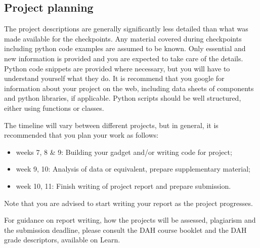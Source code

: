 \subsection{Project planning}

The project descriptions are generally significantly less detailed than what was made available for the checkpoints. Any material covered during checkpoints including python code examples are assumed to be known.  Only essential and new information is provided and you are expected to take care of the details. Python code snippets are provided where necessary, but you will have to understand yourself what they do. It is recommend that you google for information about your project on the web, including data sheets of components and python libraries, if applicable. Python scripts should be well structured, either using functions or classes.

The timeline will vary between different projects, but in general, it is recommended that you plan your work as follows:
\begin{itemize}
\item	weeks 7, 8 \& 9: 	Building your gadget and/or writing code for project;
\item	week 9, 10: 	Analysis of data or equivalent, prepare supplementary material;
\item	week 10, 11:	Finish writing of project report and prepare submission.
\end{itemize}
Note that you are advised to start writing your report as the project progresses. 

For guidance on report writing, how the projects will be assessed, plagiarism and the submission deadline, please consult the DAH course booklet and the DAH grade descriptors, available on Learn.

